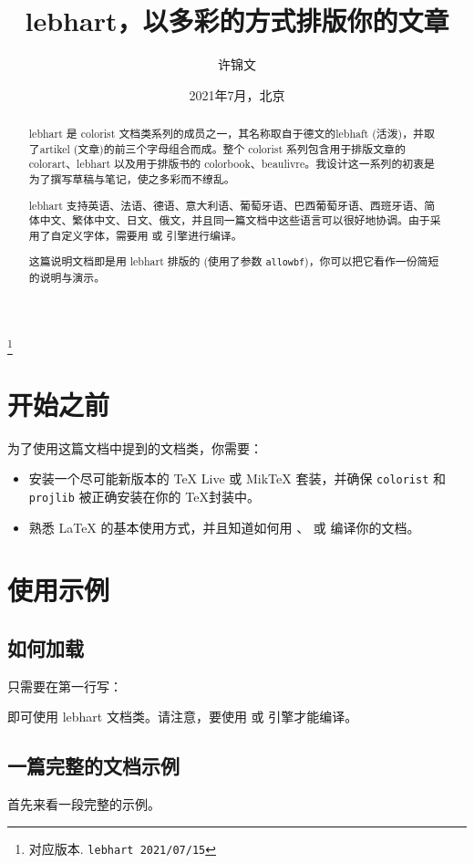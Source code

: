 \documentclass[English,Chinese,French,allowbf,puretext]{lebhart}
\theoremstyle{basic}
\theoremstyle{emphasis}
\theoremstyle{simple}
\providecommand{\colorist}{\textsf{colorist}}
\providecommand{\colorart}{\textsf{colorart}}
\providecommand{\colorbook}{\textsf{colorbook}}
\providecommand{\lebhart}{\textsf{lebhart}}
\providecommand{\beaulivre}{\textsf{beaulivre}}
\let\LevelOneTitle\section
\let\LevelTwoTitle\subsection
\begin{document}
\title{\lebhart{}，以多彩的方式排版你的文章}
\author{许锦文}
\thanks{对应版本. \texttt{\lebhart{} 2021/07/15}}
\date{2021年7月，北京}

\maketitle

\begin{abstract}
    \lebhart{} 是 \colorist{} 文档类系列的成员之一，其名称取自于德文的lebhaft (活泼)，并取了artikel (文章)的前三个字母组合而成。整个 \colorist{} 系列包含用于排版文章的 \colorart{}、\lebhart{} 以及用于排版书的 \colorbook{}、\beaulivre{}。我设计这一系列的初衷是为了撰写草稿与笔记，使之多彩而不缭乱。

    \lebhart{} 支持英语、法语、德语、意大利语、葡萄牙语、巴西葡萄牙语、西班牙语、简体中文、繁体中文、日文、俄文，并且同一篇文档中这些语言可以很好地协调。由于采用了自定义字体，需要用  或  引擎进行编译。

    这篇说明文档即是用 \lebhart{} 排版的 (使用了参数 \texttt{allowbf})，你可以把它看作一份简短的说明与演示。
\end{abstract}


\setcounter{tocdepth}{2}
\tableofcontents


\medskip
\LevelOneTitle*{开始之前}
为了使用这篇文档中提到的文档类，你需要：
\begin{itemize}
    \item 安装一个尽可能新版本的 TeX Live 或 MikTeX 套装，并确保 \texttt{colorist} 和 \texttt{projlib} 被正确安装在你的 \TeX 封装中。
    \item 熟悉 \LaTeX{} 的基本使用方式，并且知道如何用 、 或  编译你的文档。
\end{itemize}


\LevelOneTitle{使用示例}

\LevelTwoTitle{如何加载}

只需要在第一行写：


即可使用 \lebhart{} 文档类。请注意，要使用  或  引擎才能编译。

\LevelTwoTitle{一篇完整的文档示例}

首先来看一段完整的示例。
\end{document}
